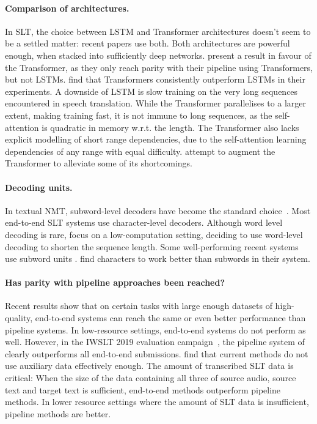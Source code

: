 \documentclass{svjour3}
\begin{document}
\paragraph{\textbf{Comparison of architectures.}}
In SLT, the choice between LSTM and Transformer architectures doesn't seem to be a settled matter:
recent papers use both.
Both architectures are powerful enough, when stacked into sufficiently deep networks.
\citet{pino2019harnessing} present a result in favour of the Transformer,
as they only reach parity with their pipeline using Transformers, but not LSTMs.
\citet{inaguma2019espnet} find that Transformers consistently outperform LSTMs in their experiments.
A downside of LSTM is slow training on the very long sequences encountered in speech translation.
While the Transformer parallelises to a larger extent, making training fast,
it is not immune to long sequences, as the self-attention is quadratic in memory w.r.t. the length.
The Transformer also lacks explicit modelling of short range dependencies,
due to the self-attention learning dependencies of any range with equal difficulty.
\citet{di2019adapting} attempt to augment the Transformer to alleviate some of its shortcomings.


\paragraph{\textbf{Decoding units.}}
In textual NMT, subword-level decoders have become the standard choice~\citep{sennrich2016neural}.
Most end-to-end SLT systems use character-level decoders.
Although word level decoding is rare,
\citet{bansal2018low} focus on a low-computation setting,
deciding to use word-level decoding to shorten the sequence length.
Some well-performing recent systems use subword units \citep{liu2019end,jia2019leveraging,pino2019harnessing,bansal2019pre}.
\citet{wang2019bridging} find characters to work better than subwords in their system.

\paragraph{\textbf{Has parity with pipeline approaches been reached?}}
Recent results \citep{jia2019leveraging,pino2019harnessing} show that on certain tasks
with large enough datasets of high-quality,
end-to-end systems can reach the same or even better performance than pipeline systems.
In low-resource settings, end-to-end systems do not perform as well.
However, in the IWSLT 2019 evaluation campaign~\citep{niehues-iwslt-2019},
the pipeline system of \citet{schneider2019kit} clearly outperforms all end-to-end submissions.
\citet{sperber2019attention} find that current methods do not use auxiliary data effectively enough.
The amount of transcribed SLT data is critical: When the size of the data containing all three
of source audio, source text and target text is sufficient, end-to-end methods outperform pipeline methods.
In lower resource settings where the amount of SLT data is insufficient, pipeline methods are better.
\end{document}
